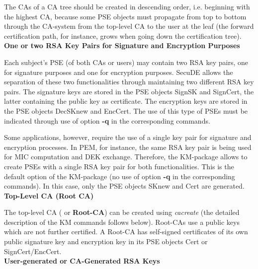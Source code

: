 The CAs of a CA tree should be created in descending order, i.e. beginning with
the highest CA, because some PSE objects must propagate from top to bottom through the CA-system 
from the top-level CA to the user at the leaf (the forward certification path, for
instance, grows when going down the certification tree).
\\ [1em]
{\bf One or two RSA Key Pairs for Signature and Encryption Purposes}

Each subject's PSE (of both CAs or users) may contain two RSA key pairs, one for signature
purposes and one for encryption purposes. SecuDE allows the separation of these two
functionalities through maintaining two different RSA key pairs.
The signature keys are stored in the PSE objects
SignSK and SignCert, the latter containing the public key as certificate. The encryption
keys are stored in the PSE objects DecSKnew and EncCert. The use of this type of PSEs
must be indicated through use of option {\bf -q} in the corresponding commands.

Some applications, however, require the use of a single key pair for signature
and encryption processes. In PEM, for instance, the same RSA key pair is being used
for MIC computation and DEK exchange. Therefore, the KM-package allows to create
PSEs with a single RSA key pair for both functionalities. This is the default option
of the KM-package (no use of option {\bf -q} in the corresponding commands). 
In this case, only the PSE objects SKnew and Cert are generated.
\\[1em]
{\bf Top-Level CA (Root CA)}

The top-level CA ( or {\bf Root-CA}) can be created using {\em cacreate} (the detailed 
description of the KM commands follows below). Root-CAs use a public keys which are
not further certified. A Root-CA has self-signed certificates of its own public
signature key and encryption key in its PSE objects Cert or SignCert/EncCert.
\\ [1em]
{\bf User-generated or CA-Generated RSA Keys}

